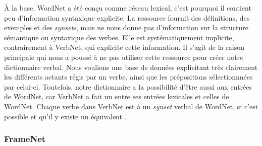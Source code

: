 À la base, WordNet a été conçu comme réseau lexical, c'est pourquoi il contient peu d'information syntaxique explicite. La ressource fournit des définitions, des exemples et des \emph{synsets}, mais ne nous donne pas d'information sur la structure sémantique ou syntaxique des verbes. Elle est systématiquement implicite, contrairement à VerbNet, qui explicite cette information. Il s'agit de la raison principale qui nous a poussé à ne pas utiliser cette ressource pour créer notre dictionnaire verbal. Nous voulions une base de données explicitant très clairement les différents actants régis par un verbe, ainsi que les prépositions sélectionnnées par celui-ci. Toutefois, notre dictionnaire a la possibilité d'être aussi  aux entrées de WordNet, car VerbNet a fait un  entre ses entrées lexicales et celles de WordNet. Chaque verbe dans VerbNet est  à un \emph{synset} verbal de WordNet, si c'est possible et qu'il y existe un équivalent \citep{SchulerVerbnetBroadcoverageComprehensive2005}.


\subsubsection{FrameNet}

